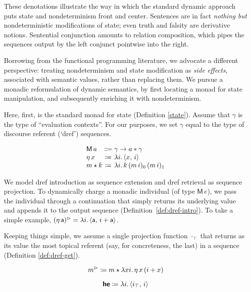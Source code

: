  These denotations illustrate the way in which the standard dynamic approach puts state and nondeterminism front and center. Sentences are in fact \emph{nothing but} nondeterministic modifications of state; even truth and falsity are derivative notions. Sentential conjunction amounts to relation composition, which pipes the sequences output by the left conjunct pointwise into the right.%
  
  Borrowing from the functional programming literature, we advocate a different perspective: treating nondeterminism and state modification as \emph{side effects}, associated with semantic values, rather than replacing them. We pursue a monadic reformulation of dynamic semantics, by first locating a monad for state manipulation, and subsequently enriching it with nondeterminism. %
   
  Here, first, is the standard monad for state (Definition \ref{state}). Assume that $\gamma$ is the type of ``evaluation contexts''. For our purposes, we set $\gamma$ equal to the type of discourse referent (`dref') sequences.%
	\begin{defi}\label{state}
		\[\begin{array}[t]
			{@{}l@{}c@{}l@{}}
			\textsf{M}\,a &{}\Coloneqq{} &\gamma \ra a \ast \gamma	%
			\\
			\eta\,x &{}\ceq{} &\lambda i.\,\ab{x,\,i}
			\\
			m \star k &{}\ceq{} &\lambda i.\,k\,(m\,i)_0\,(m\,i)_1%
		\end{array}\]
	\end{defi}
	
  We model dref introduction as sequence extension \citep[cf.][]{Groote:2006, Unger:2012, Charlow:diss} and dref retrieval as sequence projection. To dynamically charge a monadic individual (of type $\textsf{M}\,e$), we pass the individual through a continuation that simply returns its underlying value and appends it to the output sequence (Definition~\ref{def:dref-intro}). To take a simple example, $(\eta\,\textsf{a})^\rhd  = \lambda i.\,\langle \textsf{a},\,i+\textsf{a} \rangle$.%
  
  Keeping things simple, we assume a single projection function $\cdot_\top$ that returns as its value the most topical referent (say, for concreteness, the last) in a sequence (Definition \ref{def:dref-get}).%
	\begin{defi}
    \label{def:dref-intro}%
    	\[m^\rhd \coloneqq m \star \lambda xi.\,\eta\,x\,(i+x)\]
	\end{defi}
	\begin{defi}
	\label{def:dref-get}
		\[\textbf{\textsf{he}} \coloneqq \lambda i.\,\langle i_\top,\,i \rangle\]
	\end{defi}
	
